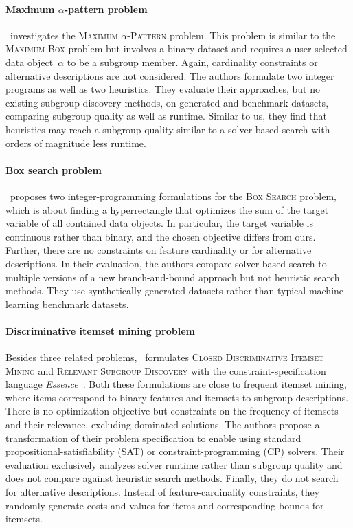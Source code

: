 \documentclass{article}
\theoremstyle{definition}
\begin{document}
\paragraph{Maximum $\alpha$-pattern problem}

\cite{bonates2008maximum}~investigates the \textsc{Maximum $\alpha$-Pattern} problem.
This problem is similar to the \textsc{Maximum Box} problem but involves a binary dataset and requires a user-selected data object~$\alpha$ to be a subgroup member.
Again, cardinality constraints or alternative descriptions are not considered.
The authors formulate two integer programs as well as two heuristics.
They evaluate their approaches, but no existing subgroup-discovery methods, on generated and benchmark datasets, comparing subgroup quality as well as runtime.
Similar to us, they find that heuristics may reach a subgroup quality similar to a solver-based search with orders of magnitude less runtime.

\paragraph{Box search problem}

\cite{louveaux2014combinatorial}~proposes two integer-programming formulations for the \textsc{Box Search} problem, which is about finding a hyperrectangle that optimizes the sum of the target variable of all contained data objects.
In particular, the target variable is continuous rather than binary, and the chosen objective differs from ours.
Further, there are no constraints on feature cardinality or for alternative descriptions.
In their evaluation, the authors compare solver-based search to multiple versions of a new branch-and-bound approach but not heuristic search methods.
They use synthetically generated datasets rather than typical machine-learning benchmark datasets.

\paragraph{Discriminative itemset mining problem}

Besides three related problems, \cite{koccak2020exploiting}~formulates \textsc{Closed Discriminative Itemset Mining} and \textsc{Relevant Subgroup Discovery} with the constraint-specification language \emph{Essence}~\cite{frisch2008ssence}.
Both these formulations are close to frequent itemset mining, where items correspond to binary features and itemsets to subgroup descriptions.
There is no optimization objective but constraints on the frequency of itemsets and their relevance, excluding dominated solutions.
The authors propose a transformation of their problem specification to enable using standard propositional-satisfiability (SAT) or constraint-programming (CP) solvers.
Their evaluation exclusively analyzes solver runtime rather than subgroup quality and does not compare against heuristic search methods.
Finally, they do not search for alternative descriptions.
Instead of feature-cardinality constraints, they randomly generate costs and values for items and corresponding bounds for itemsets.
\end{document}
